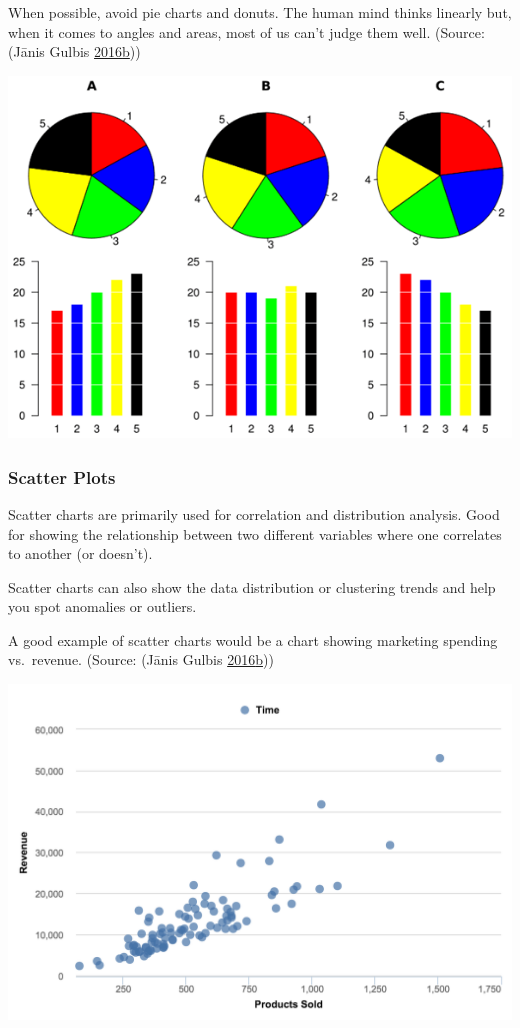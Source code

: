 \documentclass[]{book}
\begin{document}
When possible, avoid pie charts and donuts. The human mind thinks linearly but, when it comes to angles and areas, most of us can't judge them well.
(Source: (Jānis Gulbis \protect\hyperlink{ref-pick_chart}{2016}\protect\hyperlink{ref-pick_chart}{b}))

\includegraphics{images/pie-chart-diag.png}

\hypertarget{scatter-plots}{%
\subsubsection{Scatter Plots}\label{scatter-plots}}

Scatter charts are primarily used for correlation and distribution analysis. Good for showing the relationship between two different variables where one correlates to another (or doesn't).

Scatter charts can also show the data distribution or clustering trends and help you spot anomalies or outliers.

A good example of scatter charts would be a chart showing marketing spending vs.~revenue.
(Source: (Jānis Gulbis \protect\hyperlink{ref-pick_chart}{2016}\protect\hyperlink{ref-pick_chart}{b}))

\includegraphics{images/scatter-plot-diag.png}
\end{document}
